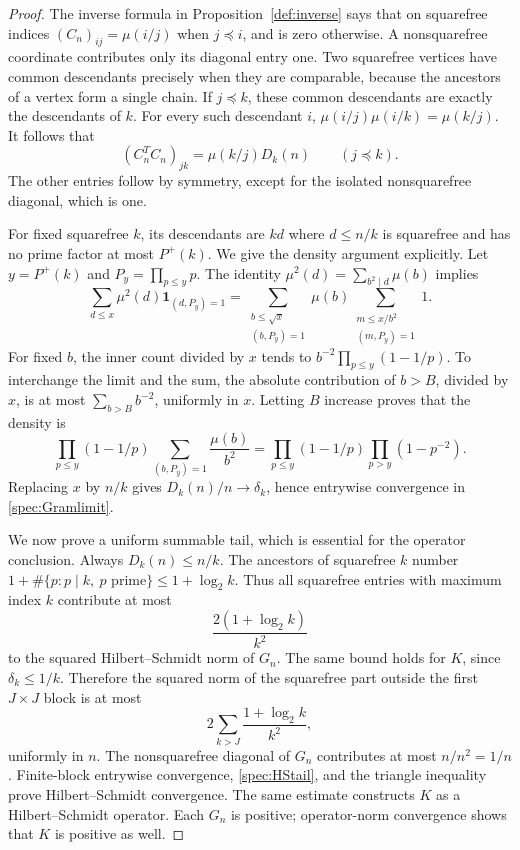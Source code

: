 \begin{proof}
The inverse formula in Proposition~\ref{def:inverse} says that on squarefree indices $(C_n)_{ij}=\mu(i/j)$ when $j\preceq i$, and is zero otherwise. A nonsquarefree coordinate contributes only its diagonal entry one. Two squarefree vertices have common descendants precisely when they are comparable, because the ancestors of a vertex form a single chain. If $j\preceq k$, these common descendants are exactly the descendants of $k$. For every such descendant $i$,
$\mu(i/j)\mu(i/k)=\mu(k/j)$. It follows that
\begin{equation}\label{spec:exactGram}
 (C_n^TC_n)_{jk}=\mu(k/j)D_k(n)\qquad(j\preceq k).
\end{equation}
The other entries follow by symmetry, except for the isolated nonsquarefree diagonal, which is one.

For fixed squarefree $k$, its descendants are $kd$ where $d\le n/k$ is squarefree and has no prime factor at most $P^+(k)$. We give the density argument explicitly. Let $y=P^+(k)$ and $P_y=\prod_{p\le y}p$. The identity $\mu^2(d)=\sum_{b^2\mid d}\mu(b)$ implies
\[
 \sum_{d\le x}\mu^2(d)\mathbf1_{(d,P_y)=1}
 =\sum_{\substack{b\le\sqrt x\\(b,P_y)=1}}\mu(b)
   \sum_{\substack{m\le x/b^2\\(m,P_y)=1}}1.
\]
For fixed $b$, the inner count divided by $x$ tends to
$b^{-2}\prod_{p\le y}(1-1/p)$. To interchange the limit and the sum, the absolute contribution of $b>B$, divided by $x$, is at most $\sum_{b>B}b^{-2}$, uniformly in $x$. Letting $B$ increase proves that the density is
\[
 \prod_{p\le y}(1-1/p)
 \sum_{(b,P_y)=1}\frac{\mu(b)}{b^2}
 =\prod_{p\le y}(1-1/p)\prod_{p>y}(1-p^{-2}).
\]
Replacing $x$ by $n/k$ gives $D_k(n)/n\to\delta_k$, hence entrywise convergence in \eqref{spec:Gramlimit}.

We now prove a uniform summable tail, which is essential for the operator conclusion. Always $D_k(n)\le n/k$. The ancestors of squarefree $k$ number $1+\#\{p:p\mid k,\ p\text{ prime}\}\le1+\log_2k$. Thus all squarefree entries with maximum index $k$ contribute at most
\[
 \frac{2(1+\log_2k)}{k^2}
\]
to the squared Hilbert--Schmidt norm of $G_n$. The same bound holds for $K$, since $\delta_k\le1/k$. Therefore the squared norm of the squarefree part outside the first $J\times J$ block is at most
\begin{equation}\label{spec:HStail}
 2\sum_{k>J}\frac{1+\log_2k}{k^2},
\end{equation}
uniformly in $n$. The nonsquarefree diagonal of $G_n$ contributes at most $n/n^2=1/n$. Finite-block entrywise convergence, \eqref{spec:HStail}, and the triangle inequality prove Hilbert--Schmidt convergence. The same estimate constructs $K$ as a Hilbert--Schmidt operator. Each $G_n$ is positive; operator-norm convergence shows that $K$ is positive as well.


\end{proof}

